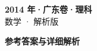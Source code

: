 \documentclass[zihao=-4, a4paper]{ctexart}
\begin{document}
\begin{center}
  {\Large\bfseries 2014 年·广东卷·理科}\\[4pt]
  {\large 数学 · 解析版}
\end{center}
\medskip
{}

\clearpage
{}
\begin{center}{\Large\bfseries 参考答案与详细解析}\end{center}
\medskip

\end{document}

